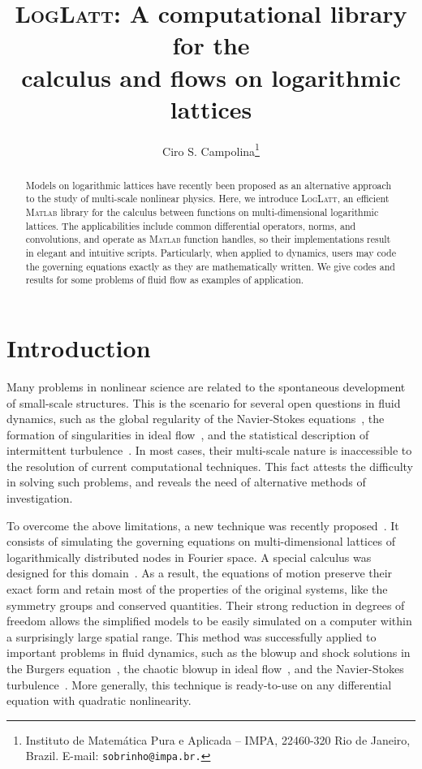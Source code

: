\documentclass[12pt]{article}
\title{\textsc{LogLatt}: A computational library for the \\calculus and flows on logarithmic lattices}
\author{Ciro S. Campolina\thanks{Instituto de Matem\'{a}tica Pura e Aplicada -- IMPA, 22460-320 Rio de Janeiro, Brazil. E-mail: \texttt{sobrinho@impa.br.}}}
\date{}
\theoremstyle{definition}
\begin{document}
	
	\maketitle
	
	\begin{abstract}
		Models on logarithmic lattices have recently been proposed as an alternative approach to the study of multi-scale nonlinear physics.
		Here, we introduce \textsc{LogLatt}, an efficient \textsc{Matlab}\textsuperscript{\circledR} library for the calculus between functions on multi-dimensional logarithmic lattices.
		The applicabilities include common differential operators, norms, and convolutions,
		and operate as \textsc{Matlab} function handles, so their implementations result in elegant and intuitive scripts.
		Particularly, when applied to dynamics, users may code the governing equations exactly as they are mathematically written.
		We give codes and results for some problems of fluid flow as examples of application.
	\end{abstract}
	
	\section{Introduction}
	
	Many problems in nonlinear science are related to the spontaneous development of small-scale structures.
	This is the scenario for several open questions in fluid dynamics, such as the global regularity of the Navier-Stokes equations~\cite{fefferman2006existence}, the formation of singularities in ideal flow~\cite{gibbon2008three}, and the statistical description of intermittent turbulence~\cite{frisch1995turbulence}.
	In most cases, their multi-scale nature is inaccessible to the resolution of current computational techniques.
	This fact attests the difficulty in solving such problems, and reveals the need of alternative methods of investigation.
	
	To overcome the above limitations, a new technique was recently proposed~\cite{campolina2018chaotic}.
	It consists of simulating the governing equations on multi-dimensional lattices of logarithmically distributed nodes in Fourier space.
	A special calculus was designed for this domain~\cite{campolina2021fluid}.
	As a result, the equations of motion preserve their exact form and retain most of the properties of the original systems, like the symmetry groups and conserved quantities.
	Their strong reduction in degrees of freedom allows the simplified models to be easily simulated on a computer within a surprisingly large spatial range.
	This method was successfully applied to important problems in fluid dynamics, such as the blowup and shock solutions in the Burgers equation~\cite{campolina2019fluid}, the chaotic blowup in ideal flow~\cite{campolina2018chaotic}, and the Navier-Stokes turbulence~\cite{campolina2021fluid}.
	More generally, this technique is ready-to-use on any differential equation with quadratic nonlinearity.
	
\end{document}

